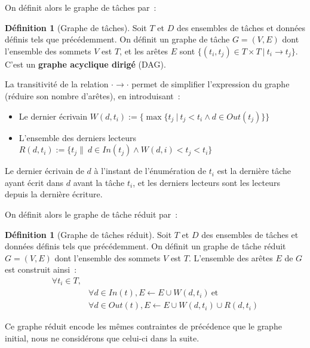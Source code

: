 \documentclass[11pt]{article}
\theoremstyle{plain} %
\theoremstyle{definition} %
\newtheorem{defi}[thm]{Définition}
\begin{document}
On définit alors le graphe de tâches par~:
\begin{defi}[Graphe de tâches]
  Soit $T$ et $D$ des ensembles de tâches et données définis tels que précédemment.
  On définit un graphe de tâche $G = (V, E)$ dont l'ensemble des sommets $V$ est $T$, et les arêtes $E$ sont $\{(t_i, t_j) \in T\times T \ |\  t_i \to t_j \}$.
  C'est un \textbf{graphe acyclique dirigé} (DAG).
\end{defi}

La transitivité de la relation $\cdot \to \cdot$ permet de simplifier l'expression du graphe (réduire son nombre d'arêtes), en introduisant~:
\begin{itemize}
\item Le dernier écrivain $W(d, t_i) := \{\max \{t_j \ |\  t_j < t_i \wedge d \in Out(t_j) \}\}$
\item L'ensemble des derniers lecteurs $R(d, t_i) := \{t_j \| \ d\in In(t_j) \wedge W(d, i) < t_j < t_i \}$
\end{itemize}
Le dernier écrivain de $d$ à l'instant de l'énumération de $t_i$ est la dernière tâche ayant écrit dans $d$ avant la tâche $t_i$, et les derniers lecteurs sont les lecteurs depuis la dernière écriture.

On définit alors le graphe de tâche réduit par~:
\begin{defi}[Graphe de tâches réduit]
  Soit $T$ et $D$ des ensembles de tâches et données définis tels que précédemment.
  On définit un graphe de tâche réduit $G = (V, E)$ dont l'ensemble des sommets $V$ est $T$.
  L'ensemble des arêtes $E$ de $G$ est construit ainsi~:
  \begin{align*}
    \forall t_i \in T,&\\
    &\forall d \in In(t), E \gets E \cup W(d, t_i) \ \text{et}\\
    &\forall d \in Out(t), E \gets E \cup W(d, t_i) \cup R(d, t_i)
  \end{align*}
\end{defi}

Ce graphe réduit encode les mêmes contraintes de précédence que le graphe initial, nous ne considérons que celui-ci dans la suite.
\end{document}
